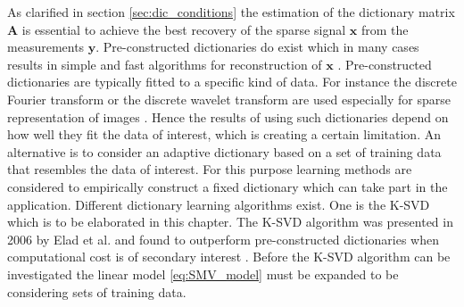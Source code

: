 As clarified in section \ref{sec:dic_conditions} the estimation of the dictionary matrix $\mathbf{A}$ is essential to achieve the best recovery of the sparse signal $\mathbf{x}$ from the measurements $\mathbf{y}$. Pre-constructed dictionaries do exist which in many cases results in simple and fast algorithms for reconstruction of $\mathbf{x}$ \cite{Elad_book}. Pre-constructed dictionaries are typically fitted to a specific kind of data. For instance the discrete Fourier transform or the discrete wavelet transform are used especially for sparse representation of images \cite{Elad_book}. Hence the results of using such dictionaries depend on how well they fit the data of interest, which is creating a certain limitation. An alternative is to consider an adaptive dictionary based on a set of training data that resembles the data of interest. For this purpose learning methods are considered to empirically construct a fixed dictionary which can take part in the application. Different dictionary learning algorithms exist. One is the K-SVD which is to be elaborated in this chapter. The K-SVD algorithm was presented in 2006 by Elad et al. and found to outperform pre-constructed dictionaries when computational cost is of secondary interest \cite{Elad2006}. Before the K-SVD algorithm can be investigated the linear model \eqref{eq:SMV_model} must be expanded to be considering sets of training data.

